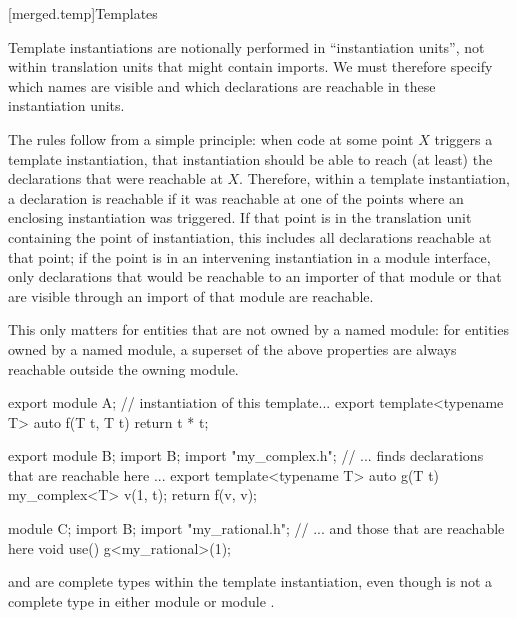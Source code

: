 [merged.temp]{Templates}

\pnum
Template instantiations are notionally performed in ``instantiation units'',
not within translation units that might contain imports.
We must therefore specify
which names are visible and
which declarations are reachable
in these instantiation units.

\pnum
The rules follow from a simple principle:
when code at some point $X$ triggers a template instantiation,
that instantiation should be able to reach (at least)
the declarations that were reachable at $X$.
Therefore, within a template instantiation,
a declaration is reachable if
it was reachable at one of the points where
an enclosing instantiation was triggered.
If that point is in the translation unit
containing the point of instantiation,
this includes all declarations reachable
at that point;
if the point is in an intervening instantiation
in a module interface,
only declarations that would be reachable
to an importer of that module
or that are visible through an import of that module
are reachable.
\begin{note}
This only matters for entities that are
not owned by a named module:
for entities owned by a named module,
a superset of the above properties
are always reachable outside the owning module.
\end{note}

\pnum
\begin{example}
\begin{codeblock}
export module A;
// instantiation of this template...
export template<typename T> auto f(T t, T t) {
  return t * t;
}
\end{codeblock}

\begin{codeblock}
export module B;
import B;
import "my_complex.h";
// ... finds declarations that are reachable here ...
export template<typename T> auto g(T t) {
  my_complex<T> v(1, t);
  return f(v, v);
}
\end{codeblock}

\begin{codeblock}
module C;
import B;
import "my_rational.h";
// ... and those that are reachable here
void use() {
  g<my_rational>(1);
}
\end{codeblock}

 and  are complete
types within the template instantiation,
even though
 is not a complete type
in either module  or module .
\end{example}

